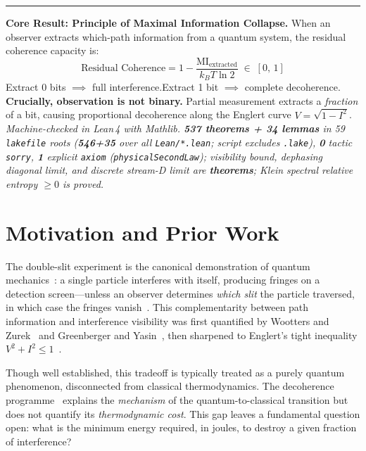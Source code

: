 \documentclass[11pt, a4paper]{article}
\newenvironment{leftbox}{%
  \par\vspace{0.5em}%
  \noindent\hspace{0pt}%
  \begin{minipage}[t]{3pt}\color{Black}\rule{3pt}{6.5\baselineskip}\end{minipage}%
  \hspace{10pt}%
  \begin{minipage}[t]{\dimexpr\textwidth-17pt}\small
}{%
  \end{minipage}\par\vspace{0.5em}%
}
\begin{document}
\begin{leftbox}
\textbf{Core Result: Principle of Maximal Information Collapse.}
When an observer extracts which-path information from a quantum system, the residual coherence capacity is:
\[
\text{Residual Coherence} = 1 - \frac{\text{MI}_{\text{extracted}}}{k_B T \ln 2} \;\in\; [0,\,1]
\]
Extract 0 bits $\implies$ full interference.\quad Extract 1 bit $\implies$ complete decoherence.\\[3pt]
\textbf{Crucially, observation is not binary.} Partial measurement extracts a \emph{fraction} of a bit, causing proportional decoherence along the Englert curve $V = \sqrt{1 - I^2}$.\\[3pt]
\textit{Machine-checked in Lean\,4 with Mathlib.\; \textbf{537 theorems + 34 lemmas} in 59 \texttt{lakefile} roots (\textbf{546+35} over all \texttt{Lean/*.lean}; script excludes \texttt{.lake}), \textbf{0} tactic \texttt{sorry}, \textbf{1} explicit \texttt{axiom} (\texttt{physicalSecondLaw}); visibility bound, dephasing diagonal limit, and discrete stream-D limit are \textbf{theorems}; Klein spectral relative entropy $\geq 0$ is proved.}
\end{leftbox}

\section{Motivation and Prior Work}

The double-slit experiment is the canonical demonstration of quantum mechanics~\cite{feynman1965, vonneumann1932}: a single particle interferes with itself, producing fringes on a detection screen---unless an observer determines \emph{which slit} the particle traversed, in which case the fringes vanish~\cite{bohr1928}. This complementarity between path information and interference visibility was first quantified by Wootters and Zurek~\cite{wootters1979} and Greenberger and Yasin~\cite{greenberger1988}, then sharpened to Englert's tight inequality $V^2 + I^2 \le 1$~\cite{englert1996}.

Though well established, this tradeoff is typically treated as a purely quantum phenomenon, disconnected from classical thermodynamics. The decoherence programme~\cite{zurek2003, schlosshauer2005} explains the \emph{mechanism} of the quantum-to-classical transition but does not quantify its \emph{thermodynamic cost}. This gap leaves a fundamental question open: what is the minimum energy required, in joules, to destroy a given fraction of interference?
\end{document}
